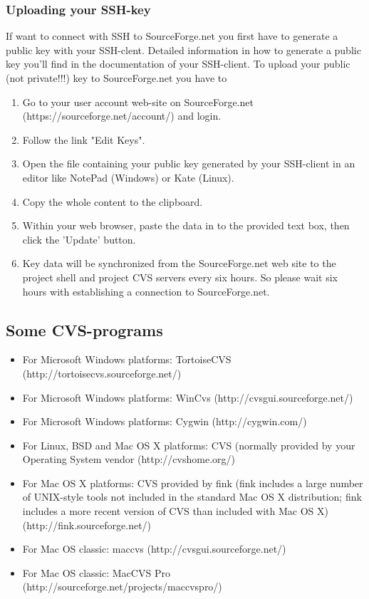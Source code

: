 \subsubsection{Uploading your SSH-key}

If want to connect with SSH to SourceForge.net you first have to generate a public key with your SSH-clent. Detailed information in how to generate a public key you'll find in the documentation of your SSH-client.
To upload your public (not private!!!) key to SourceForge.net you have to

\begin{enumerate}
\item Go to your user account web-site on SourceForge.net (https://sourceforge.net/account/) and login.
\item Follow the link "Edit Keys".
\item Open the file containing your public key generated by your SSH-client in an editor like NotePad (Windows) or Kate (Linux).
\item Copy the whole content to the clipboard.
\item Within your web browser, paste the data in to the provided text box, then click the 'Update' button.
\item Key data will be synchronized from the SourceForge.net web site to the project shell and project CVS servers every six hours. So please wait six hours with establishing a connection to SourceForge.net.
\end{enumerate} 

\subsection{Some CVS-programs}

\begin{itemize}
\item For Microsoft Windows platforms: TortoiseCVS (http://tortoisecvs.sourceforge.net/)
\item For Microsoft Windows platforms: WinCvs (http://cvsgui.sourceforge.net/)
\item For Microsoft Windows platforms: Cygwin (http://cygwin.com/)
\item For Linux, BSD and Mac OS X platforms: CVS (normally provided by your Operating System vendor (http://cvshome.org/)
\item For Mac OS X platforms: CVS provided by fink (fink includes a large number of UNIX-style tools not included in the standard Mac OS X distribution; fink includes a more recent version of CVS than included with Mac OS X)(http://fink.sourceforge.net/)
\item For Mac OS classic: maccvs (http://cvsgui.sourceforge.net/)
\item For Mac OS classic: MacCVS Pro (http://sourceforge.net/projects/maccvspro/)
\end{itemize}

